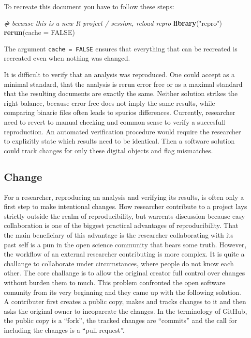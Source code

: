 \documentclass[12pt,a4paper,]{article}
\newenvironment{Shaded}{\begin{snugshade}}{\end{snugshade}}
\newcommand{\CommentTok}[1]{\textcolor[rgb]{0.56,0.35,0.01}{\textit{#1}}}
\newcommand{\DataTypeTok}[1]{\textcolor[rgb]{0.13,0.29,0.53}{#1}}
\newcommand{\KeywordTok}[1]{\textcolor[rgb]{0.13,0.29,0.53}{\textbf{#1}}}
\newcommand{\NormalTok}[1]{#1}
\newcommand{\OtherTok}[1]{\textcolor[rgb]{0.56,0.35,0.01}{#1}}
\newcommand{\StringTok}[1]{\textcolor[rgb]{0.31,0.60,0.02}{#1}}
\begin{document}
To recreate this document you have to follow these steps:

\begin{Shaded}
\begin{Highlighting}[]
\CommentTok{# because this is a new R project / session, reload repro}
\KeywordTok{library}\NormalTok{(}\StringTok{"repro"}\NormalTok{)}
\KeywordTok{rerun}\NormalTok{(}\DataTypeTok{cache =} \OtherTok{FALSE}\NormalTok{)}
\end{Highlighting}
\end{Shaded}

The argument \texttt{cache\ =\ FALSE} ensures that everything that can be recreated is recreated even when nothing was changed.

It is difficult to verify that an analysis was reproduced.
One could accept as a minimal standard, that the analysis is rerun error free or as a maximal standard that the resulting documents are exactly the same.
Neither solution strikes the right balance, because error free does not imply the same results, while comparing binarie files often leads to spurios differences.
Currently, researcher need to revert to manual checking and common sense to verify a succesfull reproduction.
An automated verification procedure would require the researcher to explizitly state which results need to be identical.
Then a software solution could track changes for only these digital objects and flag mismatches.

\hypertarget{change}{%
\subsection{Change}\label{change}}

For a researcher, reproducing an analysis and verifying its results, is often only a first step to make intentional changes.
How researcher contribute to a project lays strictly outside the realm of reproducibility, but warrents discussion because easy collaboration is one of the biggest practical advantages of reproducibility.
That the main beneficiary of this advantage is the researcher collaborating with its past self is a pun in the open science community that bears some truth.
However, the workflow of an external researcher contributing is more complex.
It is quite a challange to collaborate under circumstances, where people do not know each other.
The core challange is to allow the original creator full control over changes without burden them to much.
This problem confronted the open software comunity from its very beginning and they came up with the following solution.
A contributer first creates a public copy, makes and tracks changes to it and then asks the original owner to incopareate the changes.
In the terminology of GitHub, the public copy is a ``fork'', the tracked changes are ``commits'' and the call for including the changes is a ``pull request''.
\end{document}
